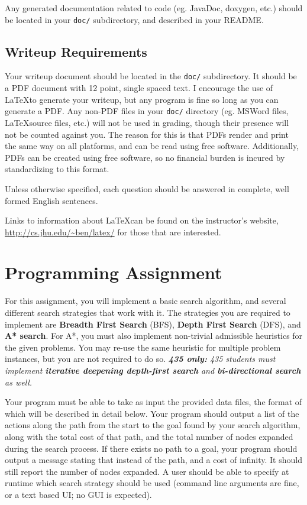 \documentclass[12pt]{article}
\newcommand{\ttt}[1]{\texttt{#1}}
\begin{document}
Any generated documentation related to code (eg. JavaDoc, doxygen, etc.) should
be located in your \ttt{doc/} subdirectory, and described in your README.

\subsection{Writeup Requirements}
Your writeup document should be located in the \ttt{doc/} subdirectory.  It
should be a PDF document with 12 point, single spaced text.  I encourage the use
of \LaTeX to generate your writeup, but any program is fine so long as you can
generate a PDF.  Any non-PDF files in your \ttt{doc/} directory (eg. MSWord
files, \LaTeX source files, etc.) will not be used in grading, though their
presence will not be counted against you.  The reason for this is that PDFs
render and print the same way on all platforms, and can be read using free
software.  Additionally, PDFs can be created using free software, so no
financial burden is incured by standardizing to this format.

Unless otherwise specified, each question should be answered in complete, well
formed English sentences.

Links to information about \LaTeX can be found on the instructor's website,
\url{http://cs.jhu.edu/~ben/latex/} for those that are interested.


\section{Programming Assignment}
For this assignment, you will implement a basic search algorithm, and several
different search strategies that work with it.  The strategies you are required
to implement are \textbf{Breadth First Search} (BFS), \textbf{Depth First
Search} (DFS), and \textbf{A* search}.  For A*, you must also implement
non-trivial admissible heuristics for the given problems.  You may re-use the
same heuristic for multiple problem instances, but you are not required to do
so. \emph{\textbf{435 only:} 435 students must implement \textbf{iterative
deepening depth-first search} and \textbf{bi-directional search} as well.}

Your program must be able to take as input the provided data files, the format
of which will be described in detail below.  Your program should output a list
of the actions along the path from the start to the goal found by your search
algorithm, along with the total cost of that path, and the total number of nodes
expanded during the search process.  If there exists no path to a goal, your
program should output a message stating that instead of the path, and a cost of
infinity.  It should still report the number of nodes expanded.
A user should be able to specify at runtime
which search strategy should be used (command line arguments are fine, or a text
based UI; no GUI is expected).
\end{document}
